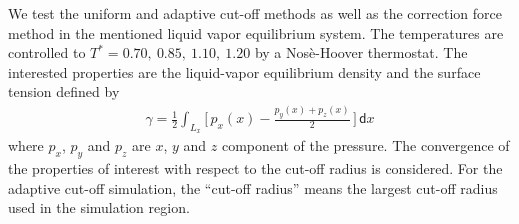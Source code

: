 \documentclass[aps,pre,preprint]{revtex4}
\renewcommand{\d}[1]{\textsf{#1}}
\begin{document}

We test the uniform and adaptive cut-off methods as well as the
correction force method in the mentioned liquid vapor equilibrium
system. The temperatures are controlled to $T^\ast = 0.70,\ 0.85,\
1.10,\ 1.20$ by a Nos\`e-Hoover thermostat. The interested properties are
the liquid-vapor equilibrium density and the surface tension defined
by
\begin{align}
  \gamma = \frac12 \int_{L_x}
  \bigg[\,
  p_x(x) - \frac{p_y(x) + p_z(x)}{2}
  \,\bigg]
  \,\d dx
\end{align}
where $p_x$, $p_y$ and $p_z$ are $x$, $y$ and $z$ component of the
pressure. The convergence of the properties of interest with respect
to the cut-off radius is considered.  For the adaptive cut-off
simulation, the ``cut-off radius'' means the largest cut-off radius
used in the simulation region. 
\end{document}
